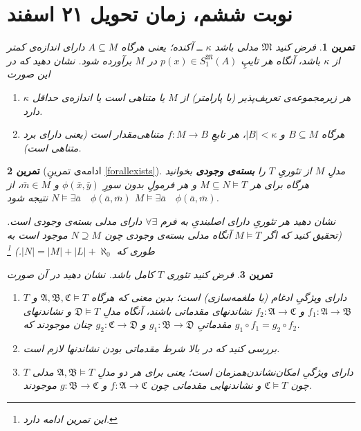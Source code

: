 \documentclass[12pt,a4paper]{report}
\theoremstyle{colorhead}
\newtheorem{tam}{تمرین}
\begin{document}
\section{نوبت ششم،  زمان تحویل  ۲۱ اسفند}
\begin{tam}
\label{definable-small}
فرض کنید
$\mathfrak{M}$
مدلی باشد 
$\kappa$ ــ
آکنده؛ یعنی هرگاه
$A\subseteq M$
دارای اندازه‌ی کمتر از
$\kappa$
باشد، آنگاه هر تایپِ
$p(x)\in S_1^\mathfrak{M}(A)$
در
$M$
برآورده شود. نشان دهید که در این صورت
\begin{enumerate}
\item 
هر زیرمجموعه‌ی تعریف‌پذیر (با پارامتر)
از
$M$
یا متناهی است یا اندازه‌ی حداقل
$\kappa$
دارد. 
\item 
هرگاه 
$B\subseteq M$
و
$|B|< \kappa$،
هر تابعِ
$f:M\to B$
متناهی‌مقدار است (یعنی دارای برد متناهی است).
\end{enumerate}
\end{tam}
\begin{tam}
[ادامه‌ی تمرینِ
\ref{forallexists}]
\label{basteyevojudi}
مدلِ
$M$
از تئوریِ
$T$
را 
\textbf{بسته‌ی وجودی }
بخوانید
هرگاه برای هر
$M\subseteq N\models T$
و هر فرمولِ بدون سورِ
$\phi(\bar{x},\bar{y})$
و 
$\bar{m}\in M$،
از
$N\models \exists \bar{a}\quad \phi(\bar{a},\bar{m})$
نتیجه شود
$M\models \exists \bar{a}\quad \phi(\bar{a},\bar{m})$.
\par 
نشان دهید هر تئوریِ دارای اصلبندیِ به فرم
$\forall\exists$
دارای مدلی بسته‌ی وجودی است. (تحقیق کنید که اگر
$M\models T$
آنگاه مدلی
بسته‌ی وجودی 
 چون
$N\supseteq M$
موجود است به طوری که
$|N|=|M|+|L|+\aleph_0$.)
\footnote{	این تمرین ادامه دارد.}
\end{tam}
\begin{tam}
فرض کنید
تئوری
$T$
کامل باشد. نشان دهید در آن صورت
\begin{enumerate}
\item 
$T$
دارای ویژگیِ ادغام (یا ملغمه‌سازی)
است؛ بدین معنی که هرگاه
$\mathfrak{A},\mathfrak{B},\mathfrak{C}\models T$
و
$f_1:\mathfrak{A}\to \mathfrak{B}$
و
$f_2:\mathfrak{A}\to \mathfrak{C}$
نشاندنهای مقدماتی باشند، آنگاه مدلِ
$\mathfrak{D}\models T$
و نشاندنهای مقدماتیِ
$g_1:\mathfrak{B}\to \mathfrak{D}$
و
$g_2:\mathfrak{C}\to \mathfrak{D}$
چنان موجودند که 
$g_1\circ f_1=g_2\circ f_2$.
\item 
بررسی کنید که در بالا شرط مقدماتی بودن نشاندنها لازم است.
\item 
$T$
دارای ويژگیِ 
امکان‌نشاندن‌همزمان 
است؛
یعنی برای هر دو مدلِ
$\mathfrak{A},\mathfrak{B}\models T$
مدلی چون
$\mathfrak{C}\models T$
و نشاندنهایی مقدماتی چون
$f:\mathfrak{A}\to \mathfrak{C}$
و
$g:\mathfrak{B}\to \mathfrak{C}$
موجودند.
\end{enumerate}
\end{tam}
\end{document}
